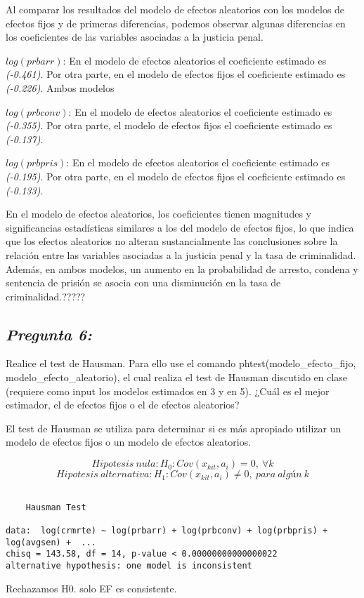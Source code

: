 \documentclass[
  12pt,
]{article}
\begin{document}
Al comparar los resultados del modelo de efectos aleatorios con los
modelos de efectos fijos y de primeras diferencias, podemos observar
algunas diferencias en los coeficientes de las variables asociadas a la
justicia penal.

\(log(prbarr)\): En el modelo de efectos aleatorios el coeficiente
estimado es \emph{(-0.461)}. Por otra parte, en el modelo de efectos
fijos el coeficiente estimado es \emph{(-0.226)}. Ambos modelos

\(log(prbconv)\): En el modelo de efectos aleatorios el coeficiente
estimado es \emph{(-0.355)}. Por otra parte, el modelo de efectos fijos
el coeficiente estimado es \emph{(-0.137)}.

\(log(prbpris)\): En el modelo de efectos aleatorios el coeficiente
estimado es \emph{(-0.195)}. Por otra parte, en el modelo de efectos
fijos el coeficiente estimado es \emph{(-0.133)}.

En el modelo de efectos aleatorios, los coeficientes tienen magnitudes y
significancias estadísticas similares a los del modelo de efectos fijos,
lo que indica que los efectos aleatorios no alteran sustancialmente las
conclusiones sobre la relación entre las variables asociadas a la
justicia penal y la tasa de criminalidad. Además, en ambos modelos, un
aumento en la probabilidad de arresto, condena y sentencia de prisión se
asocia con una disminución en la tasa de criminalidad.?????

\subsection{\texorpdfstring{\textbf{\emph{Pregunta
6:}}}{Pregunta 6:}}\label{pregunta-6}

Realice el test de Hausman. Para ello use el comando
phtest(modelo\_efecto\_fijo, modelo\_efecto\_aleatorio), el cual realiza
el test de Hausman discutido en clase (requiere como input los modelos
estimados en 3 y en 5). ¿Cuál es el mejor estimador, el de efectos fijos
o el de efectos aleatorios?

El test de Hausman se utiliza para determinar si es más apropiado
utilizar un modelo de efectos fijos o un modelo de efectos aleatorios.

\[Hipotesis\ nula: H_0 : Cov(x_{kit},a_i ) = 0 ,\  \forall k\]
\[Hipotesis\ alternativa: H_1 : Cov(x_{kit},a_i ) \neq 0, \ para \ algún \ k \]

\begin{verbatim}

    Hausman Test

data:  log(crmrte) ~ log(prbarr) + log(prbconv) + log(prbpris) + log(avgsen) +  ...
chisq = 143.58, df = 14, p-value < 0.00000000000000022
alternative hypothesis: one model is inconsistent
\end{verbatim}

Rechazamos H0. solo EF es consistente.
\end{document}
